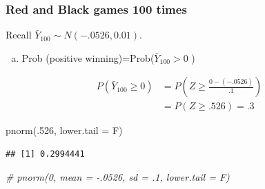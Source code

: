 \documentclass[
  ignorenonframetext,
]{beamer}
\newenvironment{Shaded}{\begin{snugshade}}{\end{snugshade}}
\newcommand{\AttributeTok}[1]{\textcolor[rgb]{0.77,0.63,0.00}{#1}}
\newcommand{\CommentTok}[1]{\textcolor[rgb]{0.56,0.35,0.01}{\textit{#1}}}
\newcommand{\DecValTok}[1]{\textcolor[rgb]{0.00,0.00,0.81}{#1}}
\newcommand{\FunctionTok}[1]{\textcolor[rgb]{0.00,0.00,0.00}{#1}}
\newcommand{\NormalTok}[1]{#1}
\providecommand{\tightlist}{%
  \setlength{\itemsep}{0pt}\setlength{\parskip}{0pt}}
\begin{document}
\begin{frame}[fragile]
\frametitle{Red and Black games 100 times}

Recall \(\bar{Y}_{100} \sim N(-.0526, 0.01)\).

\begin{enumerate}
[a)]
\tightlist
\item
  Prob (positive winning)=Prob(\(\bar{Y}_{100} > 0\) )
\end{enumerate}

\[\begin{split}
P(\bar{Y}_{100} \geq 0) &=
P\left(Z \geq \frac{0-(-.0526)}{.1} \right) \\
&= P\left(Z \geq .526 \right) = .3
\end{split}\]

\begin{Shaded}
\begin{Highlighting}[]
\FunctionTok{pnorm}\NormalTok{(.}\DecValTok{526}\NormalTok{, }\AttributeTok{lower.tail =}\NormalTok{ F)}
\end{Highlighting}
\end{Shaded}

\begin{verbatim}
## [1] 0.2994441
\end{verbatim}

\begin{Shaded}
\begin{Highlighting}[]
\CommentTok{\# pnorm(0, mean = {-}.0526, sd = .1, lower.tail = F)}
\end{Highlighting}
\end{Shaded}
\end{frame}
\end{document}
